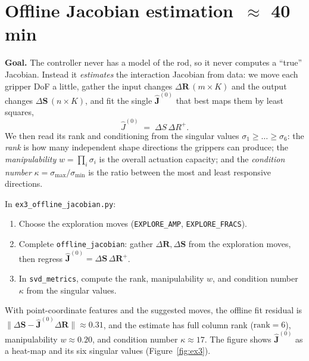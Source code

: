 \documentclass[11pt,a4paper]{article}
\newcommand{\budget}[1]{\hfill{\normalfont\small\colorbox{TitleBlue!10}{\textcolor{TitleBlue}{\,$\approx$ #1\,}}}}
\begin{document}
\section{Offline Jacobian estimation \budget{40 min}}

\textbf{Goal.} The controller never has a model of the rod, so it never computes a ``true''
Jacobian. Instead it \emph{estimates} the interaction Jacobian from data: we move each
gripper DoF a little, gather the input changes $\Delta\mathbf{R}\,(m\times K)$ and the output
changes $\Delta\mathbf{S}\,(n\times K)$, and fit the single $\hat{\mathbf{J}}^{(0)}$ that best maps them by
least squares,
\[
    \hat J^{(0)} \;=\; \Delta S\,\Delta R^{+}.
\]
We then read its rank and conditioning from the singular values
$\sigma_1\ge\dots\ge\sigma_6$: the \emph{rank} is how many independent shape directions the
grippers can produce; the \emph{manipulability} $w=\prod_i\sigma_i$ is the overall actuation
capacity; and the \emph{condition number} $\kappa=\sigma_{\max}/\sigma_{\min}$ is the ratio
between the most and least responsive directions.

\begin{taskbox}
In \texttt{ex3\_offline\_jacobian.py}:
\begin{enumerate}
    \item Choose the exploration moves (\texttt{EXPLORE\_AMP}, \texttt{EXPLORE\_FRACS}).
    \item Complete \texttt{offline\_jacobian}: gather $\Delta\mathbf{R},\Delta\mathbf{S}$ from the
    exploration moves, then regress $\hat{\mathbf{J}}^{(0)}=\Delta\mathbf{S}\,\Delta\mathbf{R}^{+}$.
    \item In \texttt{svd\_metrics}, compute the rank, manipulability $w$, and condition
    number $\kappa$ from the singular values.
\end{enumerate}
\end{taskbox}

\begin{checkbox}
With point-coordinate features and the suggested moves, the offline fit residual is
$\lVert\Delta\mathbf{S}-\hat{\mathbf{J}}^{(0)}\Delta\mathbf{R}\rVert\approx 0.31$, and the estimate has full column
rank ($\mathrm{rank}=6$), manipulability $w\approx 0.20$, and condition number
$\kappa\approx 17$. The figure shows $\hat{\mathbf{J}}^{(0)}$ as a heat-map and its six singular
values (Figure~\ref{fig:ex3}).
\end{checkbox}
\end{document}
